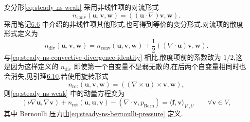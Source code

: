 \begin{note}\label{note:steady-ns-equivalent-variational-forms}
变分形\cref{eq:steady-ns-weak} 采用非线性项的对流形式
\[
  n_{\mathrm{conv}}(\bm{u},\bm{v},\bm{w})
    =((\bm{u}\cdot\nabla)\bm{v},\bm{w}).
\]
采用笔记\hyperref[note:steady-ns-convection-forms]{6.6} 中介绍的非线性项其他形式,也可得到等价的变分形式.对流项的散度形式定义为
\begin{equation}\label{eq:steady-ns-ndiv-definition}
  n_{\mathrm{div}}(\bm{u},\bm{v},\bm{w})
    =n_{\mathrm{conv}}(\bm{u},\bm{v},\bm{w})
     +\frac12((\nabla\cdot\bm{u})\bm{v},\bm{w}).
\end{equation}
与\cref{eq:steady-ns-convective-divergence-identity} 相比,散度项前的系数改为 $1/2$,这是因为这样定义的 $n_{\mathrm{div}}$ 即使第一个自变量不是弱无散的,在后两个自变量相同时也会消失,见引理\hyperref[lem:steady-ns-convection-vanishing]{6.10}.若使用旋转形式
\begin{equation}\label{eq:steady-ns-nrot-definition}
  n_{\mathrm{rot}}(\bm{u},\bm{v},\bm{w})
    =((\nabla\times\bm{u})\times\bm{v},\bm{w}),
\end{equation}
则\cref{eq:steady-ns-weak} 中的动量方程变为
\[
  (\nu\nabla\bm{u},\nabla\bm{v})
   +n_{\mathrm{rot}}(\bm{u},\bm{u},\bm{v})
   -(\nabla\cdot\bm{v},p_{\mathrm{Bern}})
     =\langle\bm{f},\bm{v}\rangle_{V',V}
       \qquad\forall\bm{v}\in V,
\]
其中 Bernoulli 压力由\cref{eq:steady-ns-bernoulli-pressure} 定义.


\end{note}
